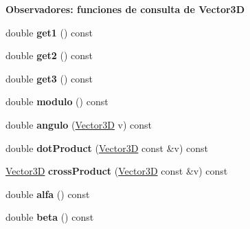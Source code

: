 \begin{Indent}{\bf Observadores\+: funciones de consulta de Vector3D}\par
\begin{DoxyCompactItemize}
\item 
double {\bfseries get1} () const \hypertarget{classed_1_1Vector3D_ad8944bffeecccc9e21669a6a20b2c77d}{}\label{classed_1_1Vector3D_ad8944bffeecccc9e21669a6a20b2c77d}

\item 
double {\bfseries get2} () const \hypertarget{classed_1_1Vector3D_abc0363d157e7be0fc96b20092db75b6b}{}\label{classed_1_1Vector3D_abc0363d157e7be0fc96b20092db75b6b}

\item 
double {\bfseries get3} () const \hypertarget{classed_1_1Vector3D_a528e7798677289133a8f69ae6cd4cb89}{}\label{classed_1_1Vector3D_a528e7798677289133a8f69ae6cd4cb89}

\item 
double {\bfseries modulo} () const \hypertarget{classed_1_1Vector3D_a5e36b71f69237674484afccaf564a70e}{}\label{classed_1_1Vector3D_a5e36b71f69237674484afccaf564a70e}

\item 
double {\bfseries angulo} (\hyperlink{classed_1_1Vector3D}{Vector3D} v) const \hypertarget{classed_1_1Vector3D_afd67e97085b93ecccf71ebfc704f6d1f}{}\label{classed_1_1Vector3D_afd67e97085b93ecccf71ebfc704f6d1f}

\item 
double {\bfseries dot\+Product} (\hyperlink{classed_1_1Vector3D}{Vector3D} const \&v) const \hypertarget{classed_1_1Vector3D_a635fb5f347c703c8d8797b12b0fced8b}{}\label{classed_1_1Vector3D_a635fb5f347c703c8d8797b12b0fced8b}

\item 
\hyperlink{classed_1_1Vector3D}{Vector3D} {\bfseries cross\+Product} (\hyperlink{classed_1_1Vector3D}{Vector3D} const \&v) const \hypertarget{classed_1_1Vector3D_ac124dbe3b9c4f25e4d398c93c5882223}{}\label{classed_1_1Vector3D_ac124dbe3b9c4f25e4d398c93c5882223}

\item 
double {\bfseries alfa} () const \hypertarget{classed_1_1Vector3D_a4ccc36acd9521fcbf6722c1a05382174}{}\label{classed_1_1Vector3D_a4ccc36acd9521fcbf6722c1a05382174}

\item 
double {\bfseries beta} () const \hypertarget{classed_1_1Vector3D_a18a5bc2930896a63f5b2c3f689c14cd4}{}\label{classed_1_1Vector3D_a18a5bc2930896a63f5b2c3f689c14cd4}


\end{DoxyCompactItemize}
\end{Indent}
